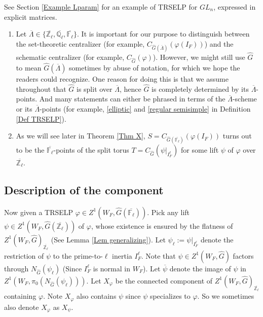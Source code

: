     See Section \ref{Example Lparam} for an example of TRSELP for $GL_n$, expressed in explicit matrices.

  \begin{remark}
  	\begin{enumerate}
  		\item Let $\overline{\Lambda} \in \{\overline{\mathbb{Z}_{\ell}}, \overline{\mathbb{Q}_{\ell}}, \overline{\mathbb{F}_{\ell}}\}$. It is important for our purpose to distinguish between the set-theoretic centralizer (for example, $C_{\hat{G}(\overline{\Lambda})}(\varphi(I_F))$) and the schematic centralizer (for example, $C_{\hat{G}}(\varphi)$). However, we might still use $\hat{G}$ to mean $\hat{G}(\overline{\Lambda})$ sometimes by abuse of notation, for which we hope the readers could recognize. One reason for doing this is that we assume throughout that $\hat{G}$ is split over $\overline{\Lambda}$, hence $\hat{G}$ is completely determined by its $\overline{\Lambda}$-points. And many statements can either be phrased in terms of the $\overline{\Lambda}$-scheme or its $\overline{\Lambda}$-points (for example, \ref{elliptic} and \ref{regular semisimple} in Definition \ref{Def TRSELP}).
  		\item As we will see later in Theorem \ref{Thm X}, $S=C_{\hat{G}(\overline{\mathbb{F}_{\ell}})}(\varphi(I_F))$ turns out to be the $\overline{\mathbb{F}_{\ell}}$-points of the split torus $T=C_{\hat{G}}(\psi|_{I_F^{\ell}})$ for some lift $\psi$ of $\varphi$ over $\overline{\mathbb{Z}_{\ell}}$.
  	\end{enumerate}
  \end{remark}

\subsection{Description of the component}\label{Subsection the component}

Now given a TRSELP $\varphi \in Z^1(W_F, \hat{G}(\overline{\mathbb{F}_{\ell}}))$. Pick any lift $\psi \in Z^1(W_F, \hat{G}(\overline{\mathbb{Z}_{\ell}}))$ of $\varphi$, whose existence is ensured by the flatness of $Z^1(W_F, \hat{G})_{\overline{\mathbb{Z}_{\ell}}}$ (See Lemma \ref{Lem generalizing}). Let $\psi_{\ell}:=\psi|_{I_F^{\ell}}$ denote the restriction of $\psi$ to the prime-to-$\ell$ inertia $I_F^{\ell}$. Note that $\psi \in Z^1(W_F, \hat{G})$ factors through $N_{\hat{G}}(\psi_{\ell})$ (Since $I_F^{\ell}$ is normal in $W_F$). Let $\overline{\psi}$ denote the image of $\psi$ in $Z^1(W_F, \pi_0(N_{\hat{G}}(\psi_{\ell})))$. Let $X_{\varphi}$ be the connected component of $Z^1(W_F, \hat{G})_{\overline{\mathbb{Z}_{\ell}}}$ containing $\varphi$. Note $X_{\varphi}$ also contains $\psi$ since $\psi$ specializes to $\varphi$. So we sometimes also denote $X_{\varphi}$ as $X_{\psi}$.


